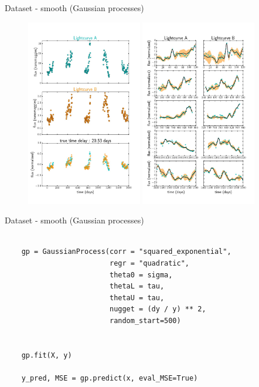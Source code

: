 \documentclass[9pt]{beamer}
\begin{document}
\begin{frame}{Dataset - smooth (Gaussian processes)}
  \begin{figure}
    \includegraphics[width=0.45\textwidth]{Fig1.jpg}
    \hspace{0.05\textwidth}
    \includegraphics[width=0.45\textwidth]{Fig2.jpg}
  \end{figure}
\end{frame}

\begin{frame}[fragile]{Dataset - smooth (Gaussian processes)}
  \begin{verbatim}

    gp = GaussianProcess(corr = "squared_exponential",
                         regr = "quadratic",
                         theta0 = sigma,
                         thetaL = tau,
                         thetaU = tau,
                         nugget = (dy / y) ** 2,
                         random_start=500)


    gp.fit(X, y)

    y_pred, MSE = gp.predict(x, eval_MSE=True)

  \end{verbatim}
\end{frame}
\end{document}
